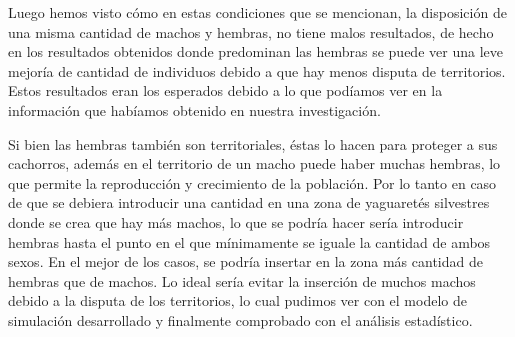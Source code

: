   Luego hemos visto cómo en estas condiciones que se mencionan, la disposición de una misma cantidad de machos y hembras, no tiene malos resultados, de hecho en los resultados obtenidos donde predominan las hembras se puede ver una leve mejoría de cantidad de individuos debido a que hay menos disputa de territorios. Estos resultados eran los esperados debido a lo que podíamos ver en la información que habíamos obtenido en nuestra investigación.

  Si bien las hembras también son territoriales, éstas lo hacen para proteger a sus cachorros, además en el territorio de un macho puede haber muchas hembras, lo que permite la reproducción y crecimiento de la población. Por lo tanto en caso de que se debiera introducir una cantidad en una zona de yaguaretés silvestres donde se crea que hay más machos, lo que se podría hacer sería introducir hembras hasta el punto en el que mínimamente se iguale la cantidad de ambos sexos. En el mejor de los casos, se podría insertar en la zona más cantidad de hembras que de machos. Lo ideal sería evitar la inserción de muchos machos debido a la disputa de los territorios, lo cual pudimos ver con el modelo de simulación desarrollado y finalmente comprobado con el análisis estadístico.